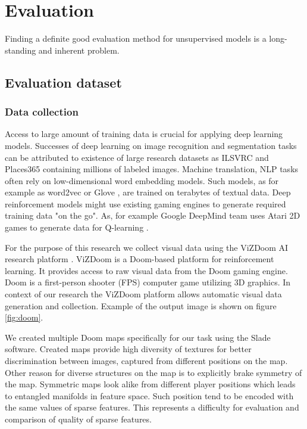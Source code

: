 
\chapter{Evaluation}
\label{ch:eval}

Finding a definite good evaluation method for unsupervised models is a long-standing and inherent problem.


\section{Evaluation dataset}
\subsection{Data collection}

Access to large amount of training data is crucial for applying deep learning models.
Successes of deep learning on image recognition and segmentation tasks can be attributed to existence of large research datasets as ILSVRC and Places365 \cite{ILSVRC15, Zhou2016} containing millions of labeled images.
Machine translation, NLP tasks \cite{Karpathy2014, Kim2014} often rely on low-dimensional word embedding models.
Such models, as for example as word2vec or Glove \cite{Mikolov2013, pennington2014glove}, are trained on terabytes of textual data.
Deep reinforcement models might use existing gaming engines to generate required training data "on the go".
As, for example Google DeepMind team uses Atari 2D games to generate data for Q-learning \cite{Mnih2013}.

For the purpose of this research we collect visual data using the ViZDoom AI research platform \cite{Kempka2016}.
ViZDoom is a Doom-based platform for reinforcement learning.
It provides access to raw visual data from the Doom gaming engine.
Doom is a first-person shooter (FPS) computer game utilizing 3D graphics.
In context of our research the ViZDoom platform allows automatic visual data generation and collection.
Example of the output image is shown on figure \ref{fig:doom}.

We created multiple Doom maps specifically for our task using the Slade \cite{Slade3} software.
Created maps provide high diversity of textures for better discrimination between images, captured from different positions on the map.
Other reason for diverse structures on the map is to explicitly brake symmetry of the map.
Symmetric maps look alike from different player positions which leads to entangled manifolds in feature space.
Such position tend to be encoded with the same values of sparse features.
This represents a difficulty for evaluation and comparison of quality of sparse features.

